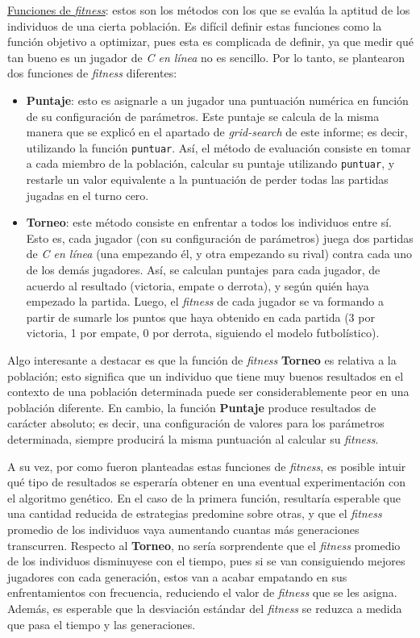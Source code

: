 \documentclass[12pt,a4paper]{article}
\begin{document}
    \underline{Funciones de \textit{fitness}}: estos son los métodos con los que se evalúa la aptitud de los individuos de una cierta población. Es difícil definir estas funciones como la función objetivo a optimizar, pues esta es complicada de definir, ya que medir qué tan bueno es un jugador de \textit{C en línea} no es sencillo. Por lo tanto, se plantearon dos funciones de \textit{fitness} diferentes:
        \begin{itemize}
            \item \textbf{Puntaje}: esto es asignarle a un jugador una puntuación numérica en función de su configuración de parámetros. Este puntaje se calcula de la misma manera que se explicó en el apartado de \textit{grid-search} de este informe; es decir, utilizando la función \texttt{puntuar}. Así, el método de evaluación consiste en tomar a cada miembro de la población, calcular su puntaje utilizando \texttt{puntuar}, y restarle un valor equivalente a la puntuación de perder todas las partidas jugadas en el turno cero.
            \item \textbf{Torneo}: este método consiste en enfrentar a todos los individuos entre sí. Esto es, cada jugador (con su configuración de parámetros) juega dos partidas de \textit{C en línea} (una empezando él, y otra empezando su rival) contra cada uno de los demás jugadores. Así, se calculan puntajes para cada jugador, de acuerdo al resultado (victoria, empate o derrota), y según quién haya empezado la partida. Luego, el \textit{fitness} de cada jugador se va formando a partir de sumarle los puntos que haya obtenido en cada partida (3 por victoria, 1 por empate, 0 por derrota, siguiendo el modelo futbolístico).
        \end{itemize}
    Algo interesante a destacar es que la función de \textit{fitness} \textbf{Torneo} es relativa a la población; esto significa que un individuo que tiene muy buenos resultados en el contexto de una población determinada puede ser considerablemente peor en una población diferente. En cambio, la función \textbf{Puntaje} produce resultados de carácter absoluto; es decir, una configuración de valores para los parámetros determinada, siempre producirá la misma puntuación al calcular su \textit{fitness}.
    
    A su vez, por como fueron planteadas estas funciones de \textit{fitness}, es posible intuir qué tipo de resultados se esperaría obtener en una eventual experimentación con el algoritmo genético. En el caso de la primera función, resultaría esperable que una cantidad reducida de estrategias predomine sobre otras, y que el \textit{fitness} promedio de los individuos vaya aumentando cuantas más generaciones transcurren. Respecto al \textbf{Torneo}, no sería sorprendente que el \textit{fitness} promedio de los individuos disminuyese con el tiempo, pues si se van consiguiendo mejores jugadores con cada generación, estos van a acabar empatando en sus enfrentamientos con frecuencia, reduciendo el valor de \textit{fitness} que se les asigna. Además, es esperable que la desviación estándar del \textit{fitness} se reduzca a medida que pasa el tiempo y las generaciones.
    
\end{document}
